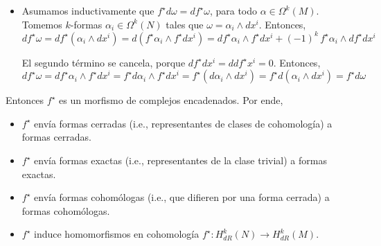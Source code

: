 \begin{solution}
\begin{itemize}
    \item Asumamos inductivamente que $f^\star d\omega = df^\star \omega$, para todo $\alpha \in \Omega^k(M)$. Tomemos $k$-formas $\alpha_i \in \Omega^k(N)$ tales que $\omega = \alpha_i \wedge dx^i$. Entonces,
    $$df^\star \omega = df^\star (\alpha_i \wedge dx^i) = d(f^\star \alpha_i \wedge f^\star dx^i) = df^\star \alpha_i \wedge f^\star dx^i + (-1)^k \, f^\star \alpha_i \wedge df^\star dx^i$$
    
    El segundo término se cancela, porque $df^\star dx^i = ddf^\star x^i = 0$. Entonces,
    $$df^\star \omega = df^\star \alpha_i \wedge f^\star dx^i = f^\star d\alpha_i \wedge f^\star dx^i = f^\star (d\alpha_i \wedge dx^i) = f^\star d(\alpha_i \wedge dx^i) = f^\star d\omega$$
\end{itemize}
Entonces $f^\star$ es un morfismo de complejos encadenados. Por ende,
\begin{itemize}
    \item $f^\star$ envía formas cerradas (i.e., representantes de clases de cohomología) a formas cerradas.
    \item $f^\star$ envía formas exactas (i.e., representantes de la clase trivial) a formas exactas.
    \item $f^\star$ envía formas cohomólogas (i.e., que difieren por una forma cerrada) a formas cohomólogas.
    \item $f^\star$ induce homomorfismos en cohomología $f^\star : H_{dR}^k(N) \to H_{dR}^k(M)$.
\end{itemize}
\end{solution}

